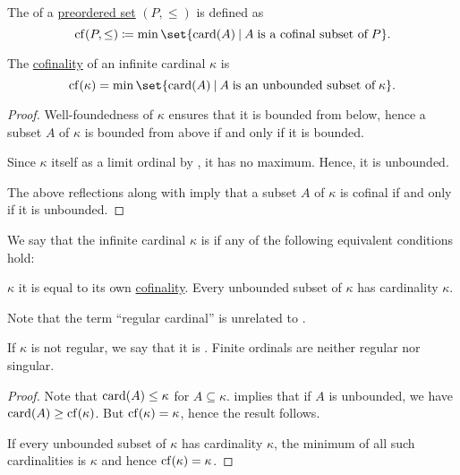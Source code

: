 \begin{definition}\label{def:cofinality}
  The  of a \hyperref[def:preordered_set]{preordered set} \( (P, \leq) \) is defined as
  \begin{equation*}
    \op{cf}(P, \leq) \coloneqq \min\set{ \card(A) \given A \T{is a cofinal subset of} P }.
  \end{equation*}
\end{definition}

\begin{proposition}\label{thm:cardinal_cofinality}
  The \hyperref[def:cofinality]{cofinality} of an infinite cardinal \( \kappa \) is
  \begin{equation*}
    \op{cf}(\kappa) = \min\set{ \card(A) \given A \T{is an unbounded subset of} \kappa }.
  \end{equation*}
\end{proposition}
\begin{proof}
  Well-foundedness of \( \kappa \) ensures that it is bounded from below, hence a subset \( A \) of \( \kappa \) is bounded from above if and only if it is bounded.

  Since \( \kappa \) itself as a limit ordinal by , it has no maximum. Hence, it is unbounded.

  The above reflections along with  imply that a subset \( A \) of \( \kappa \) is cofinal if and only if it is unbounded.
\end{proof}

\begin{definition}\label{def:regular_cardinal}
  We say that the infinite cardinal \( \kappa \) is  if any of the following equivalent conditions hold:
  \begin{thmenum}
     \( \kappa \) it is equal to its own \hyperref[def:cofinality]{cofinality}.
     Every unbounded subset of \( \kappa \) has cardinality \( \kappa \).
  \end{thmenum}

  Note that the term \enquote{regular cardinal} is unrelated to .

  If \( \kappa \) is not regular, we say that it is . Finite ordinals are neither regular nor singular.
\end{definition}
\begin{proof}
   Note that \( \operatorname{card}(A) \leq \kappa \) for \( A \subseteq \kappa \).  implies that if \( A \) is unbounded, we have \( \operatorname{card}(A) \geq \operatorname{cf}(\kappa) \). But \( \operatorname{cf}(\kappa) = \kappa \), hence the result follows.

   If every unbounded subset of \( \kappa \) has cardinality \( \kappa \), the minimum of all such cardinalities is \( \kappa \) and hence \( \operatorname{cf}(\kappa) = \kappa \).
\end{proof}


